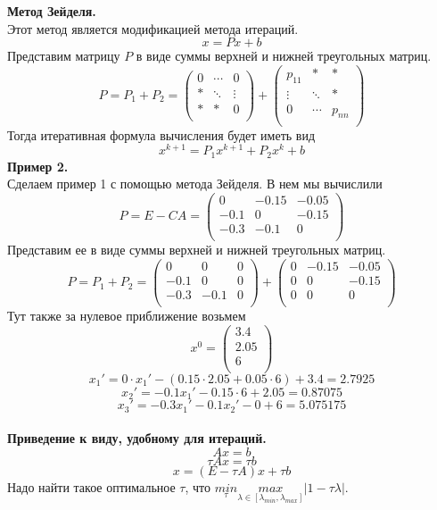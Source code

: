 \documentclass[12pt]{article}
\theoremstyle{definition}
\numberwithin{equation}{section}
\begin{document}
\textbf{Метод Зейделя.}\\
Этот метод является модификацией метода итераций. 
$$x=Px+b$$
Представим матрицу $P$ в виде суммы верхней и нижней треугольных матриц.
\[P=P_1+P_2= \begin{pmatrix}
0 & \cdots & 0\\
* & \ddots & \vdots\\
* & * & 0\\
\end{pmatrix} + \begin{pmatrix}
p_{11} & * & *\\
\vdots & \ddots & *\\
0 & \cdots & p_{nn}\\
\end{pmatrix}\]
Тогда итеративная формула вычисления будет иметь вид
$$x^{k+1}=P_1x^{k+1}+P_2x^k+b$$
\textbf{Пример 2.}\\
Сделаем пример 1 с помощью метода Зейделя. В нем мы вычислили
\[P=E-CA=\begin{pmatrix}
0 & -0.15 & -0.05\\
-0.1 & 0 & -0.15\\
-0.3 & -0.1 & 0\\
\end{pmatrix}\]
Представим ее в виде суммы верхней и нижней треугольных матриц.
\[P=P_1+P_2=\begin{pmatrix}
0 & 0 & 0\\
-0.1 & 0 & 0\\
-0.3 & -0.1 & 0\\
\end{pmatrix} + \begin{pmatrix}
0 & -0.15 & -0.05\\
0 & 0 & -0.15\\
0 & 0 & 0\\
\end{pmatrix}\]
Тут также за нулевое приближение возьмем
\[x^0=\begin{pmatrix}
3.4\\
2.05\\
6\\
\end{pmatrix}\]
$$x_1'=0\cdot x_1'-(0.15\cdot 2.05+0.05\cdot 6)+3.4=2.7925$$
$$x_2'=-0.1x_1'-0.15\cdot 6+2.05=0.87075$$
$$x_3'=-0.3x_1'-0.1x_2'-0+6=5.075175$$
\\
\textbf{Приведение к виду, удобному для итераций.}\\
$$Ax=b$$
$$\tau Ax=\tau b$$
$$x=(E-\tau A)x+\tau b$$
Надо найти такое оптимальное $\tau$, что $\underset{\tau}{min}\underset{\lambda \in [\lambda_{min},\lambda_{max}]}{max}|1-\tau \lambda|$.\\
\end{document}
